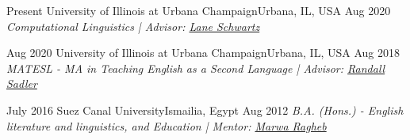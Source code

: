 \begin{educations}
\education
    {Present}   {University of Illinois at Urbana Champaign}{Urbana, IL, USA}{}
    {Aug 2020} {\textit{Computational Linguistics | Advisor: \href{http://dowobeha.github.io/about/}{Lane Schwartz}}}
    
 \emptySeparator
 \education
    {Aug 2020}   {University of Illinois at Urbana Champaign}{Urbana, IL, USA}{}
    {Aug 2018} {\textit{MATESL - MA in Teaching English as a Second Language | Advisor: \href{https://linguistics.illinois.edu/directory/profile/rsadler}{Randall Sadler}}}
    
    
 \emptySeparator
  \education
    {July 2016}   {Suez Canal University}{Ismailia, Egypt}{}
    {Aug 2012} {\textit{B.A. (Hons.) - English literature and linguistics, and Education | Mentor: \href{https://www.researchgate.net/profile/Marwa-Ragheb-2}{Marwa Ragheb}}}
\end{educations}
\vspace{-3mm}
